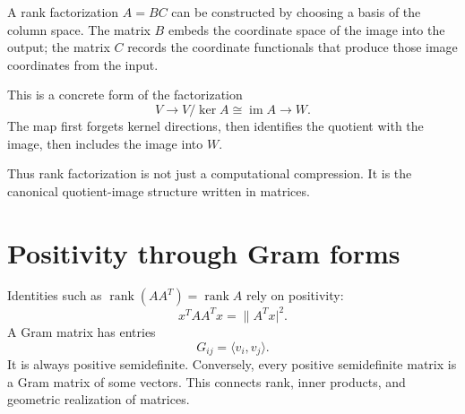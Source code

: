 A rank factorization $A=BC$ can be constructed by choosing a basis of the column space.  The matrix $B$ embeds the coordinate space of the image into the output; the matrix $C$ records the coordinate functionals that produce those image coordinates from the input.

This is a concrete form of the factorization
\[
  V\to V/\ker A\cong \operatorname{im}A\to W.
\]
The map first forgets kernel directions, then identifies the quotient with the image, then includes the image into $W$.

Thus rank factorization is not just a computational compression.  It is the canonical quotient-image structure written in matrices.

\section{Positivity through Gram forms}

Identities such as $\operatorname{rank}(AA^T)=\operatorname{rank}A$ rely on positivity:
\[
  x^TAA^Tx=\|A^Tx|^2.
\]
A Gram matrix has entries
\[
  G_{ij}=\langle v_i,v_j\rangle.
\]
It is always positive semidefinite.  Conversely, every positive semidefinite matrix is a Gram matrix of some vectors.  This connects rank, inner products, and geometric realization of matrices.
